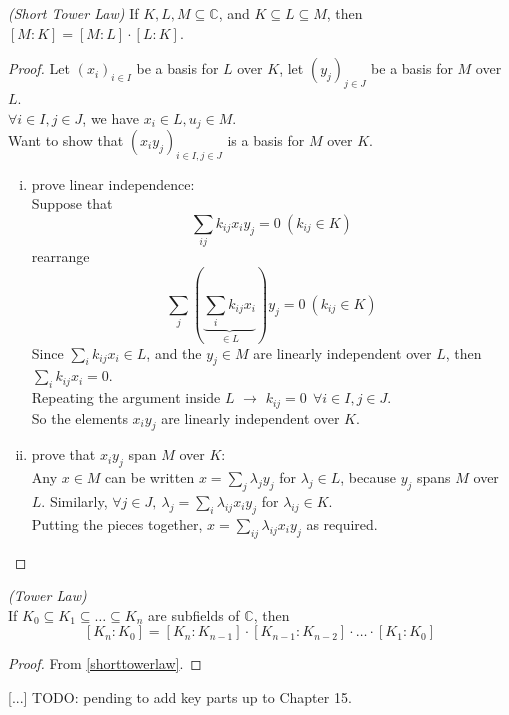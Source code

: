 \documentclass{article}
\theoremstyle{definition}
\newenvironment{thm}[1]
{\renewcommand\theinnerthm{#1}\innerthm}
{\endinnerthm}
\newenvironment{cor}[1]
{\renewcommand\theinnercor{#1}\innercor}
{\endinnercor}
\begin{document}
\begin{thm}{6.4}\emph{(Short Tower Law)} \label{shorttowerlaw}
  If $K, L, M \subseteq \mathbb{C}$, and $K \subseteq L \subseteq M$, then $[M:K]=[M:L]\cdot [L:K]$.
\end{thm}
\begin{proof}
  Let $(x_i)_{i \in I}$ be a basis for $L$ over $K$,
  let $(y_j)_{j \in J}$ be a basis for $M$ over $L$.\\
  $\forall i \in I, j \in J$, we have $x_i \in L, u_j \in M$.
  \\
  Want to show that $(x_i y_j)_{i\in I, j\in J}$ is a basis for $M$ over $K$.
  \begin{enumerate}[i.]
    \item prove linear independence:\\
      Suppose that
      $$\sum_{ij} k_{ij} x_i y_j = 0 ~(k_{ij} \in K)$$
      rearrange
      $$\sum_j (\underbrace{\sum_i k_{ij} x_i}_{\in L}) y_j = 0 ~(k_{ij} \in K)$$
      Since $\sum_i k_{ij} x_i \in L$, and the $y_j \in M$ are linearly independent over $L$, then $\sum_i k_{ij} x_i = 0$.
      \\
      Repeating the argument inside $L$ $\longrightarrow$ $k_{ij}=0 ~~\forall i\in I, j\in J$.
      \\
      So the elements $x_i y_j$ are linearly independent over $K$.

    \item prove that $x_i y_j$ span $M$ over $K$:\\
      Any $x \in M$ can be written $x=\sum_j \lambda_j y_j$ for $\lambda_j \in L$, because $y_j$ spans $M$ over $L$.
      Similarly, $\forall j\in J,~ \lambda_j = \sum_i \lambda_{ij} x_i y_j$ for  $\lambda_{ij} \in K$.\\
      Putting the pieces together, $x=\sum_{ij} \lambda_{ij} x_i y_j$ as required.
  \end{enumerate}
\end{proof}

\begin{cor}{6.6}\emph{(Tower Law)}\\ \label{towerlaw}
  If $K_0 \subseteq K_1 \subseteq \ldots \subseteq K_n$ are subfields of $\mathbb{C}$, then
  $$[K_n:K_0] = [K_n:K_{n-1}] \cdot [K_{n-1}:K_{n-2}] \cdot \ldots \cdot [K_1: K_0]$$
\end{cor}
\begin{proof}
  From \ref{shorttowerlaw}.
\end{proof}

[...] TODO: pending to add key parts up to Chapter 15.
\end{document}
